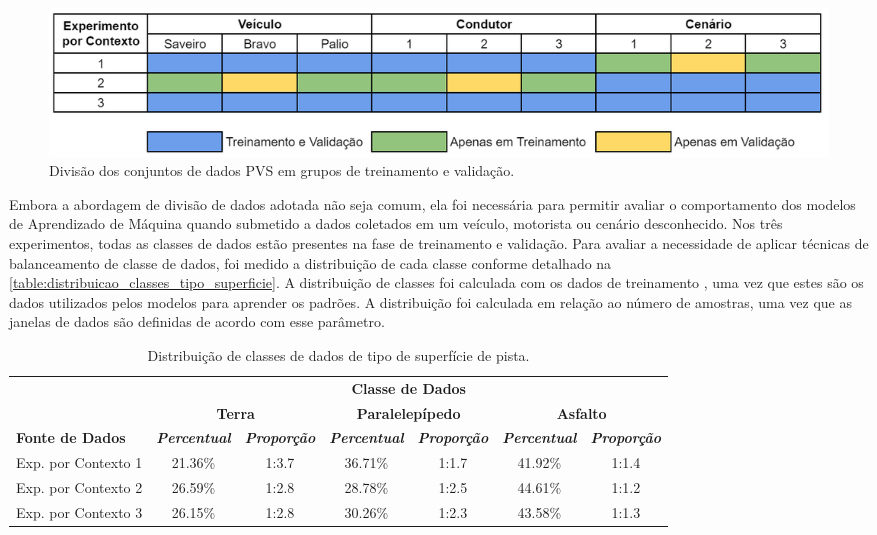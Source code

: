 \begin{figure}[h]
  \centering
  \caption{Divisão dos conjuntos de dados PVS em grupos de treinamento e validação.}
  \label{fig:divisao_conjuntos_pvs}
  \includegraphics[width=1\textwidth]{figuras/fig_29.png}
\end{figure}

Embora a abordagem de divisão de dados adotada não seja comum, ela foi necessária para permitir avaliar o comportamento dos modelos de Aprendizado de Máquina quando submetido a dados coletados em um veículo, motorista ou cenário desconhecido. Nos três experimentos, todas as classes de dados estão presentes na fase de treinamento e validação. Para avaliar a necessidade de aplicar técnicas de balanceamento de classe de dados, foi medido a distribuição de cada classe conforme detalhado na \autoref{table:distribuicao_classes_tipo_superficie}. A distribuição de classes foi calculada com os dados de treinamento \cite{He2013,Kuhn2013}, uma vez que estes são os dados utilizados pelos modelos para aprender os padrões. A distribuição foi calculada em relação ao número de amostras, uma vez que as janelas de dados são definidas de acordo com esse parâmetro.

\begin{table}[h]
\caption{Distribuição de classes de dados de tipo de superfície de pista.}
\label{table:distribuicao_classes_tipo_superficie}
\centering
\scriptsize
\begin{tabular}{lcccccc}
\cmidrule(l){2-7}
\multicolumn{1}{c}{\multirow{2}{*}{\textbf{}}} & 
\multicolumn{6}{c}{\textbf{Classe de Dados}} \\ \cmidrule(l){2-7} 
\multicolumn{1}{c}{} & 
\multicolumn{2}{c}{\textbf{Terra}} & 
\multicolumn{2}{c}{\textbf{Paralelepípedo}} & 
\multicolumn{2}{c}{\textbf{Asfalto}} \\ \midrule
\textbf{Fonte de Dados} & 
\textit{\textbf{Percentual}} & 
\textit{\textbf{Proporção}} & 
\textit{\textbf{Percentual}} & 
\textit{\textbf{Proporção}} & 
\textit{\textbf{Percentual}} & 
\textit{\textbf{Proporção}} \\ \midrule
Exp. por Contexto 1 & 21.36\% & 1:3.7 & 36.71\% & 1:1.7 & 41.92\% & 1:1.4 \\ \midrule
Exp. por Contexto 2 & 26.59\% & 1:2.8 & 28.78\% & 1:2.5 & 44.61\% & 1:1.2 \\ \midrule
Exp. por Contexto 3 & 26.15\% & 1:2.8 & 30.26\% & 1:2.3 & 43.58\% & 1:1.3 \\ \bottomrule
\end{tabular}
\end{table}

